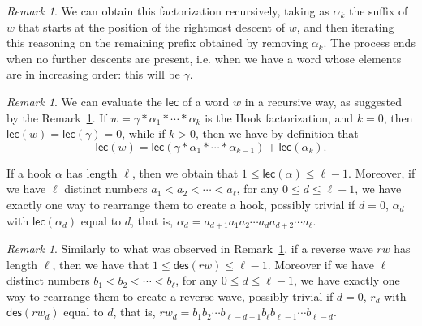\documentclass[10pt,a4paper]{amsart}
\newcommand{\des}{\mathsf{des}}
\newcommand{\lec}{\mathsf{lec}}
\theoremstyle{definition}
\theoremstyle{remark}
\newtheorem{remark}[theorem]{Remark}
\numberwithin{equation}{section}
\begin{document}
\setcounter{section}{1}
\setcounter{equation}{0}
\setcounter{manualconjinner}{0}
\setcounter{manualtheoreminner}{0}
\setcounter{theorem}{1}
\begin{remark}\label{ind_lec}
We can obtain this factorization recursively, taking as $\alpha_k$ the suffix of $w$ that starts at the position of the rightmost descent of $w$, and then iterating this reasoning on the remaining prefix obtained by removing $\alpha_k$. The process ends when no further descents are present, i.e. when we have a word whose elements are in increasing order: this will be $\gamma$.
\end{remark}

\setcounter{section}{3}
\setcounter{equation}{0}
\setcounter{manualconjinner}{0}
\setcounter{manualtheoreminner}{0}
\setcounter{theorem}{0}
\begin{remark} \label{lec_inverse}
We can evaluate the $\lec$ of a word $w$ in a recursive way, as suggested by the Remark~\ref{ind_lec}. If $w=\gamma*\alpha_1*\cdots*\alpha_k$ is the Hook factorization, and $k=0$, then $\lec(w)=\lec(\gamma)=0$, while if $k>0$, then we have by definition that
\begin{equation}
    \lec(w)=\lec(\gamma*\alpha_1*\cdots*\alpha_{k-1})+\lec(\alpha_k).
\end{equation}

If a hook $\alpha$ has length $\ell$, then we obtain that $1\leq\lec(\alpha)\leq\ell-1$. Moreover, if we have $\ell$ distinct numbers $a_1<a_2<\cdots<a_{\ell}$, for any $0\leq d\leq\ell-1$, we have exactly one way to rearrange them to create a hook, possibly trivial if $d=0$,  $\alpha_d$ with $\lec(\alpha_d)$ equal to $d$, that is, $\alpha_d=a_{d+1}a_1a_2\cdots a_da_{d+2}\cdots a_{\ell}$.
\end{remark}

\setcounter{section}{3}
\setcounter{equation}{2}
\setcounter{manualconjinner}{0}
\setcounter{manualtheoreminner}{0}
\setcounter{theorem}{3}
\begin{remark}\label{rem:unique_rwave}
Similarly to what was observed in Remark~\ref{lec_inverse}, if a reverse wave $rw$ has length $\ell $, then we have that $1\leq\des(rw)\leq\ell-1$. Moreover if we have $\ell$ distinct numbers $b_1<b_2<\cdots<b_{\ell}$, for any $0\leq d\leq\ell-1$, we have exactly one way to rearrange them to create a reverse wave, possibly trivial if $d=0$, $r_d$ with $\des(rw_d)$ equal to $d$, that is, ${rw_d=b_1b_2\cdots b_{\ell-d-1}b_{\ell}b_{\ell-1}\cdots b_{\ell-d}}$.
\end{remark}
\end{document}
